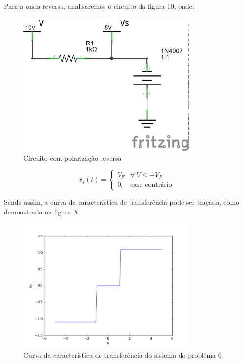 \documentclass[12pt, a4paper, twoside]{article}
\begin{document}
Para a onda reversa, analisaremos o circuito da figura 10, onde:

\begin{figure}
    \centering
    \includegraphics[width=0.8\textwidth]{figs/rel3/c6-2.png}
    \caption{Circuito com polarização reversa}
\end{figure}

\begin{equation}
    v_s(t) =
    \begin{cases}
        V_F & \forall\ V \leq -V_F \\
        0, & \text{caso contrário}
    \end{cases}
\end{equation}

Sendo assim, a curva da característica de transferência pode ser traçada, como
demonstrado na figura X.
\begin{figure}
    \centering
    \includegraphics[width=0.8\textwidth]{figs/rel3/ex6.png}
    \caption{Curva da característica de transferência do sistema do problema 6}
\end{figure}
\end{document}
